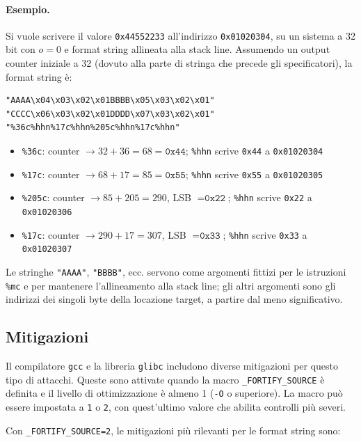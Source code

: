 \documentclass{article}
\begin{document}
\paragraph{Esempio.} Si vuole scrivere il valore \texttt{0x44552233} all'indirizzo \texttt{0x01020304}, su un sistema a 32 bit con $o = 0$ e format string allineata alla stack line. Assumendo un output counter iniziale a 32 (dovuto alla parte di stringa che precede gli specificatori), la format string è:

\begin{verbatim}
"AAAA\x04\x03\x02\x01BBBB\x05\x03\x02\x01"
"CCCC\x06\x03\x02\x01DDDD\x07\x03\x02\x01"
"%36c%hhn%17c%hhn%205c%hhn%17c%hhn"
\end{verbatim}

\begin{itemize}
    \item \texttt{\%36c}: counter $\to 32 + 36 = 68 = \texttt{0x44}$; \texttt{\%hhn} scrive \texttt{0x44} a \texttt{0x01020304}
    \item \texttt{\%17c}: counter $\to 68 + 17 = 85 = \texttt{0x55}$; \texttt{\%hhn} scrive \texttt{0x55} a \texttt{0x01020305}
    \item \texttt{\%205c}: counter $\to 85 + 205 = 290$, LSB $= \texttt{0x22}$; \texttt{\%hhn} scrive \texttt{0x22} a \texttt{0x01020306}
    \item \texttt{\%17c}: counter $\to 290 + 17 = 307$, LSB $= \texttt{0x33}$; \texttt{\%hhn} scrive \texttt{0x33} a \texttt{0x01020307}
\end{itemize}

Le stringhe \texttt{"AAAA"}, \texttt{"BBBB"}, ecc. servono come argomenti fittizi per le istruzioni \texttt{\%mc} e per mantenere l'allineamento alla stack line; gli altri argomenti sono gli indirizzi dei singoli byte della locazione target, a partire dal meno significativo.

\subsection*{Mitigazioni}

Il compilatore \texttt{gcc} e la libreria \texttt{glibc} includono diverse mitigazioni per questo tipo di attacchi. Queste sono attivate quando la macro \texttt{\_FORTIFY\_SOURCE} è definita e il livello di ottimizzazione è almeno 1 (\texttt{-O} o superiore). La macro può essere impostata a \texttt{1} o \texttt{2}, con quest'ultimo valore che abilita controlli più severi.

Con \texttt{\_FORTIFY\_SOURCE=2}, le mitigazioni più rilevanti per le format string sono:
\end{document}
